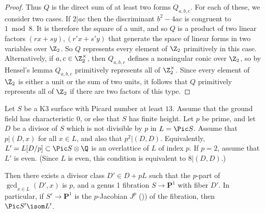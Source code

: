 \documentclass{article}
\def\F{\mathbf{F}}
\def\PP{\mathbf{P}}
\def\P{\mathbf{P}}
\begin{document}
\begin{proof}
Thus $Q$ is the direct sum of at least two forms $Q_{a,b,c}$.  For each of
these, we consider two cases.
If $2|ac$ then the discriminant $b^2-4ac$ is congruent to
$1 \bmod 8$.  It is therefore the square of a unit, and so $Q$ is a
product of two linear factors $(rx+sy),(r'x+s'y)$ that generate the space
of linear forms in two variables over $\Z_2$.
So $Q$ represents every element of $\Z_2$ primitively in this case.
Alternatively, if $a,c \in \Z_2^\times$, then
$Q_{a,b,c}$ defines a nonsingular conic over $\Z_2$, so by Hensel's
lemma $Q_{a,b,c}$ primitively represents all of $\Z_2^\times$.
Since every element of $\Z_2$ is either a unit or the sum of two units,
it follows that $Q$ primitively represents all of $\Z_2$ if there are two
factors of this type.
% 
\end{proof}

\begin{prop}\label{prop:genus-1-exists} Let $S$ be a 
  K3 surface with Picard number at least $13$.  Assume that the ground field has characteristic 0, or else that $S$ has finite height.  Let $p$ be prime, and let $D$ be a divisor of $S$ which is not divisible by $p$ in $L=\Pic S$.  Assume that $p\vert (D,x)$ for all $x\in L$, and also that $p^2\vert (D,D)$.   Equivalently, $L'=L[D/p]\subset \Pic S\otimes\Q$ is an overlattice of $L$ of index $p$.   If $p=2$, assume that $L'$ is even.  (Since $L$ is even, this condition is equivalent to $8\vert (D,D)$.)  
  
Then there exists a divisor class $D'\in D+pL$ such that the $p$-part of $\gcd_{x\in L}(D',x)$ is $p$, and a genus 1 fibration $S\to \PP^1$ with fiber $D'$.  In particular, if $S'\to \PP^1$ is the $p$-Jacobian $J^p$ (\cite[Remark 11.4.1]{huybrechts})) of the fibration, then $\Pic S'\isom L'$.  
\end{prop}
\end{document}
